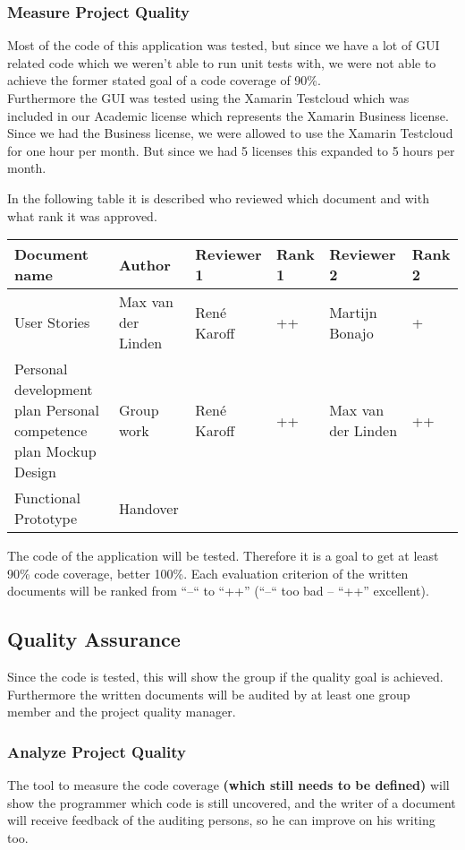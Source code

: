 \subsubsection{Measure Project Quality}
Most of the code of this application was tested, but since we have a lot of GUI related code which we weren't able to run unit tests with, we were not able to achieve the former stated goal of a code coverage of 90\%. \\
Furthermore the GUI was tested using the Xamarin Testcloud which was included in our Academic license which represents the Xamarin Business license. Since we had the Business license, we were allowed to use the Xamarin Testcloud for one hour per month. But since we had 5 licenses this expanded to 5 hours per month.

In the following table it is described who reviewed which document and with what rank it was approved.
\begin{table}[htbp]
	\begin{tabular}{ p{\textwidth} p{\textwidth} p{\textwidth} p{\textwidth} p{\textwidth} p{\textwidth} }
		\textbf{Document name} & \textbf{Author} & \textbf{Reviewer 1} & \textbf{Rank 1} & \textbf{Reviewer 2} & \textbf{Rank 2}\\ \hline
		User Stories & Max van der Linden & René Karoff & ++ & Martijn Bonajo & + \\
		Personal development plan 
		Personal competence plan
		Mockup Design & Group work & René Karoff & ++ & Max van der Linden & ++ \\
		Functional Prototype & 
		Handover
	\end{tabular}
\end{table}

The code of the application will be tested. Therefore it is a goal to get at least 90\% code coverage, better 100\%. Each evaluation criterion of the written documents will be ranked from “--“ to “++” (“--“ too bad – “++” excellent).
\subsection{Quality Assurance}
Since the code is tested, this will show the group if the quality goal is achieved. Furthermore the written documents will be audited by at least one group member and the project quality manager.
\subsubsection{Analyze Project Quality}
The tool to measure the code coverage \textbf{(which still needs to be defined)} will show the programmer which code is still uncovered, and the writer of a document will receive feedback of the auditing persons, so he can improve on his writing too.
